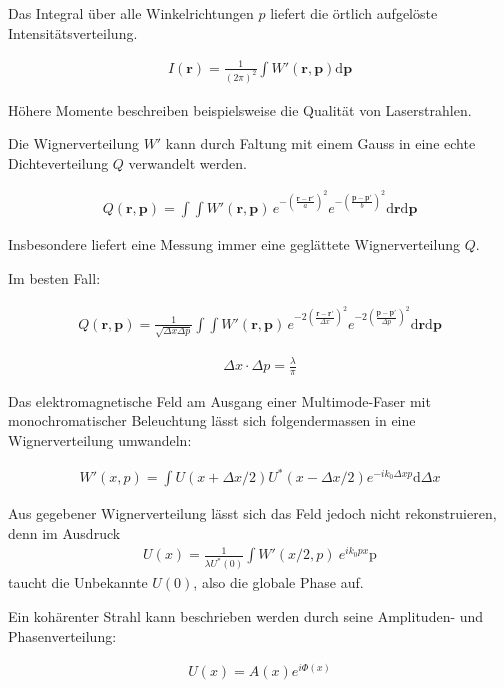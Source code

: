 \documentclass{article}
\newcommand{\vect}[1]{\mathbf{#1}}
\renewcommand{\r}{\vect r}
\newcommand{\p}{\vect p}
\begin{document}
Das Integral \"uber alle Winkelrichtungen $p$ liefert
die \"ortlich aufgel\"oste Intensit\"atsverteilung.

\begin{align}
  I(\r) = \frac{1}{(2\pi)^2} \int W'(\r,\p) \textrm{d}\p
\end{align}

H\"ohere Momente beschreiben beispielsweise die Qualit\"at von
Laserstrahlen.

Die Wignerverteilung $W'$ kann durch Faltung mit einem Gauss in eine
echte Dichteverteilung $Q$ verwandelt werden.

\begin{align}
  Q(\r,\p) = \int\int W'(\r,\p)\, e^{-\left(\frac{\r-\r'}{a}\right)^2} e^{-\left(\frac{\p-\p'}{b}\right)^2}\textrm{d}\r\textrm{d}\p
\end{align}

Insbesondere liefert eine Messung immer eine gegl\"attete
Wignerverteilung $Q$.


Im besten Fall: 

\begin{align}
  Q(\r,\p) = \frac{1}{\sqrt{\Delta x \Delta p }}\int\int W'(\r,\p)\, e^{-2 \left(\frac{\r-\r'}{\Delta x}\right)^2} e^{- 2 \left(\frac{\p-\p'}{\Delta p}\right)^2}\textrm{d}\r\textrm{d}\p
\end{align}

\begin{align}
  \Delta x \cdot \Delta p = \frac{\lambda}{\pi}
\end{align}

Das elektromagnetische Feld am Ausgang einer Multimode-Faser mit
monochromatischer Beleuchtung l\"asst sich folgendermassen in eine
Wignerverteilung umwandeln:

\begin{align}
  W'(x,p) = \int U(x+\Delta x/2) U^*(x-\Delta x/2) e^{-i k_0 \Delta x p}\textrm{d}\Delta x
\end{align}

Aus gegebener Wignerverteilung l\"asst sich das Feld jedoch nicht
rekonstruieren, denn im Ausdruck
\begin{align}
  U(x) = \frac{1}{\lambda U^*(0)} \int W'(x/2,p)\ e^{ik_0 px} \textrm{p}
\end{align}
taucht die Unbekannte $U(0)$, also die globale Phase auf.

Ein koh\"arenter Strahl kann beschrieben werden durch seine
Amplituden- und Phasenverteilung:

\begin{align}
  \label{eq:feld}
  U(x) = A(x) e^{i\Phi(x)}
\end{align}
\end{document}
